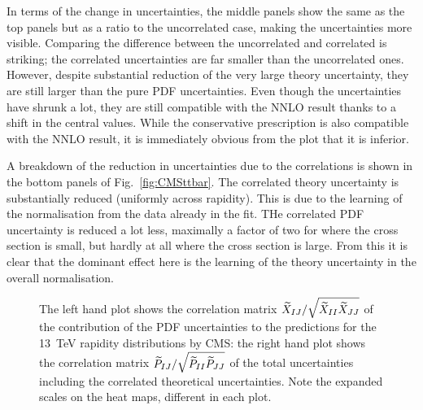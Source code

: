 In terms of the change in uncertainties, the middle panels show the same as the top panels but as a ratio to the uncorrelated case, making the uncertainties more visible. Comparing the difference between the uncorrelated and correlated is striking; the correlated uncertainties are far smaller than the uncorrelated ones. However, despite substantial reduction of the very large theory uncertainty, they are still larger than the pure PDF uncertainties. Even though the uncertainties have shrunk a lot, they are still compatible with the NNLO result thanks to a shift in the central values. While the conservative prescription is also compatible with the NNLO result, it is immediately obvious from the plot that it is inferior. 

A breakdown of the reduction in uncertainties due to the correlations is shown in the bottom panels of Fig.~\ref{fig:CMSttbar}. The correlated theory uncertainty is substantially reduced (uniformly across rapidity). This is due to the learning of the normalisation from the data already in the fit. THe correlated PDF uncertainty is reduced a lot less, maximally a factor of two for where the cross section is small, but hardly at all where the cross section is large. From this it is clear that the dominant effect here is the learning of the theory uncertainty in the overall normalisation.

\begin{figure}[h]
    \begin{center}
    \end{center}
  \vspace{-0.55cm}
  \caption{The left hand plot shows the correlation matrix $\widetilde{X}_{IJ}/\sqrt{\widetilde{X}_{II}\widetilde{X}_{JJ}}$ of the contribution of the PDF uncertainties to the predictions for the 13~TeV rapidity distributions by CMS: the right hand plot shows the correlation matrix $\widetilde{P}_{IJ}/\sqrt{\widetilde{P}_{II}\widetilde{P}_{JJ}}$ of the total uncertainties including the correlated theoretical uncertainties. Note the expanded scales on the heat maps, different in each plot.} 
  \label{fig:CMSttbarcorrlns}
\end{figure}

